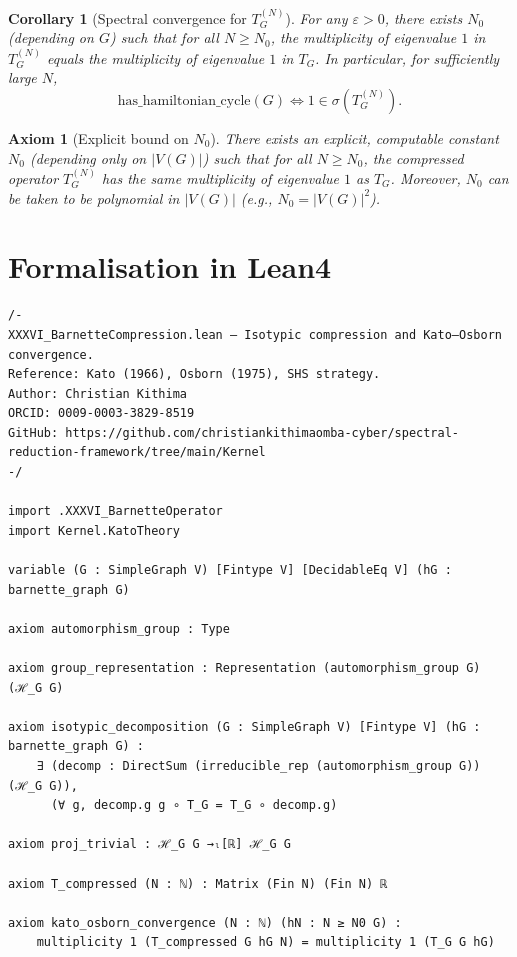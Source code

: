 \documentclass[11pt,a4paper]{article}
\newtheorem{corollary}[theorem]{Corollary}
\newtheorem{axiom}{Axiom}[section]
\begin{document}
\begin{corollary}[Spectral convergence for \(T_G^{(N)}\)]
For any \(\varepsilon > 0\), there exists \(N_0\) (depending on \(G\)) such that for all \(N \ge N_0\), the multiplicity of eigenvalue \(1\) in \(T_G^{(N)}\) equals the multiplicity of eigenvalue \(1\) in \(T_G\). In particular, for sufficiently large \(N\),
\[
\text{has\_hamiltonian\_cycle}(G) \iff 1 \in \sigma(T_G^{(N)}).
\]
\end{corollary}

\begin{axiom}[Explicit bound on \(N_0\)]
There exists an explicit, computable constant \(N_0\) (depending only on \(|V(G)|\)) such that for all \(N \ge N_0\), the compressed operator \(T_G^{(N)}\) has the same multiplicity of eigenvalue \(1\) as \(T_G\). Moreover, \(N_0\) can be taken to be polynomial in \(|V(G)|\) (e.g., \(N_0 = |V(G)|^2\)).
\end{axiom}

\section{Formalisation in Lean4}

\begin{lstlisting}[style=lean, caption={XXXVI_BarnetteCompression.lean (final)}]
/-
XXXVI_BarnetteCompression.lean – Isotypic compression and Kato–Osborn convergence.
Reference: Kato (1966), Osborn (1975), SHS strategy.
Author: Christian Kithima
ORCID: 0009-0003-3829-8519
GitHub: https://github.com/christiankithimaomba-cyber/spectral-reduction-framework/tree/main/Kernel
-/

import .XXXVI_BarnetteOperator
import Kernel.KatoTheory

variable (G : SimpleGraph V) [Fintype V] [DecidableEq V] (hG : barnette_graph G)

axiom automorphism_group : Type

axiom group_representation : Representation (automorphism_group G) (ℋ_G G)

axiom isotypic_decomposition (G : SimpleGraph V) [Fintype V] (hG : barnette_graph G) :
    ∃ (decomp : DirectSum (irreducible_rep (automorphism_group G)) (ℋ_G G)),
      (∀ g, decomp.g g ∘ T_G = T_G ∘ decomp.g)

axiom proj_trivial : ℋ_G G →ₗ[ℝ] ℋ_G G

axiom T_compressed (N : ℕ) : Matrix (Fin N) (Fin N) ℝ

axiom kato_osborn_convergence (N : ℕ) (hN : N ≥ N0 G) :
    multiplicity 1 (T_compressed G hG N) = multiplicity 1 (T_G G hG)
\end{lstlisting}
\end{document}
